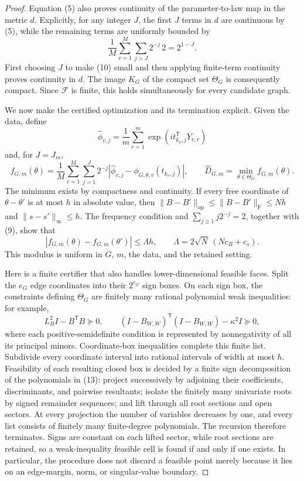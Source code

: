 \documentclass{article}
\begin{document}
\begin{proof}
Equation (5) also proves continuity of the parameter-to-law map in the
metric \(d\).  Explicitly, for any integer \(J\), the first \(J\) terms in
\(d\) are continuous by (5), while the remaining terms are uniformly bounded
by
\[
 \frac1M\sum_{v=1}^M\sum_{j>J}2^{-j}\,2=2^{1-J}.
 \tag{10}
\]
First choosing \(J\) to make (10) small and then applying finite-term
continuity proves continuity in \(d\).  The image \(K_G\) of the compact set
\(\Theta_G\) is consequently compact.  Since \(\mathcal F\) is finite, this
holds simultaneously for every candidate graph.

We now make the certified optimization and its termination explicit.  Given
the data, define
\[
 \widehat\phi_{v,j}
 =\frac1m\sum_{r=1}^m
   \exp\!\left(i t_{k_v,j}^{\mathsf T}Y_{v,r}\right)
\]
and, for \(J=J_m\),
\[
 f_{G,m}(\theta)
 =\frac1M\sum_{v=1}^M\sum_{j=1}^{J}2^{-j}
   |\widehat\phi_{v,j}-\phi_{G,\theta,v}(t_{k_v,j})|,
 \qquad
 \widehat D_{G,m}=\min_{\theta\in\Theta_G}f_{G,m}(\theta).
 \tag{11}
\]
The minimum exists by compactness and continuity.  If every free coordinate
of \(\theta-\theta'\) is at most \(h\) in absolute value, then
\(\lVert B-B'\rVert_{\mathrm{op}}
 \leq\lVert B-B'\rVert_{\mathrm F}\leq Nh\) and
\(\lVert s-s'\rVert_\infty\leq h\).  The frequency condition and
\(\sum_{j\geq1}j2^{-j}=2\), together with (9), show that
\[
 |f_{G,m}(\theta)-f_{G,m}(\theta')|
 \leq \Lambda h,
 \qquad
 \Lambda=2\sqrt N\,(Nc_B+c_s).
 \tag{12}
\]
This modulus is uniform in \(G\), \(m\), the data, and the retained setting.

Here is a finite certifier that also handles lower-dimensional feasible
faces.  Split the \(e_G\) edge coordinates into their \(2^{e_G}\) sign
boxes.  On each sign box, the constraints defining \(\Theta_G\) are finitely
many rational polynomial weak inequalities: for example,
\[
 L_B^2I-B^{\mathsf T}B\succeq0,
 \qquad
 (I-B_{W,W})^{\mathsf T}(I-B_{W,W})-\kappa^2I\succeq0,
 \tag{13}
\]
where each positive-semidefinite condition is represented by nonnegativity
of all its principal minors.  Coordinate-box inequalities complete this
finite list.  Subdivide every coordinate interval into rational intervals of
width at most \(h\).  Feasibility of each resulting closed box is decided by
a finite sign decomposition of the polynomials in (13): project successively
by adjoining their coefficients, discriminants, and pairwise resultants;
isolate the finitely many univariate roots by signed remainder sequences;
and lift through all root sections and open sectors.  At every projection the
number of variables decreases by one, and every list consists of finitely
many finite-degree polynomials.  The recursion therefore terminates.  Signs
are constant on each lifted sector, while root sections are retained, so a
weak-inequality feasible cell is found if and only if one exists.  In
particular, the procedure does not discard a feasible point merely because
it lies on an edge-margin, norm, or singular-value boundary.


\end{proof}
\end{document}
